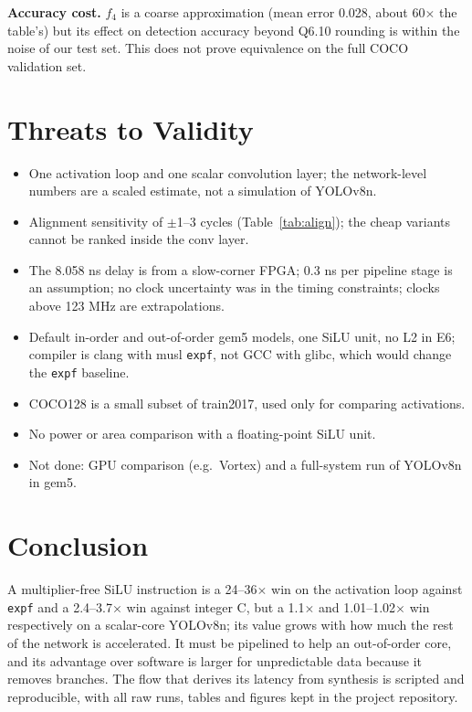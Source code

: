 \documentclass[conference]{IEEEtran}
\begin{document}
\textbf{Accuracy cost.} $f_4$ is a coarse approximation (mean error 0.028, about 60$\times$ the table's) but its effect on detection accuracy beyond Q6.10 rounding is within the noise of our test set. This does not prove equivalence on the full COCO validation set.

\section{Threats to Validity}
\begin{itemize}
\item One activation loop and one scalar convolution layer; the network-level numbers are a scaled estimate, not a simulation of YOLOv8n.
\item Alignment sensitivity of $\pm$1--3 cycles (Table~\ref{tab:align}); the cheap variants cannot be ranked inside the conv layer.
\item The 8.058 ns delay is from a slow-corner FPGA; 0.3 ns per pipeline stage is an assumption; no clock uncertainty was in the timing constraints; clocks above 123 MHz are extrapolations.
\item Default in-order and out-of-order gem5 models, one SiLU unit, no L2 in E6; compiler is clang with musl \texttt{expf}, not GCC with glibc, which would change the \texttt{expf} baseline.
\item COCO128 is a small subset of train2017, used only for comparing activations.
\item No power or area comparison with a floating-point SiLU unit.
\item Not done: GPU comparison (e.g.\ Vortex) and a full-system run of YOLOv8n in gem5.
\end{itemize}

\section{Conclusion}
A multiplier-free SiLU instruction is a 24--36$\times$ win on the activation loop against \texttt{expf} and a 2.4--3.7$\times$ win against integer C, but a 1.1$\times$ and 1.01--1.02$\times$ win respectively on a scalar-core YOLOv8n; its value grows with how much the rest of the network is accelerated. It must be pipelined to help an out-of-order core, and its advantage over software is larger for unpredictable data because it removes branches. The flow that derives its latency from synthesis is scripted and reproducible, with all raw runs, tables and figures kept in the project repository.
\end{document}
